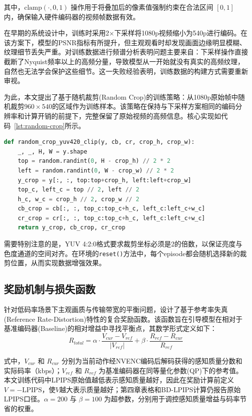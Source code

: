 其中，$\text{clamp}(\cdot, 0, 1)$ 操作用于将叠加后的像素值强制约束在合法区间 $[0, 1]$ 内，确保输入硬件编码器的视频帧数据有效。

在早期的系统设计中，训练时采用2$\times$下采样将1080p视频缩小为540p进行编码。在该方案下，模型的PSNR指标有所提升，但主观观看时却发现画面边缘明显模糊、纹理细节丢失严重。对训练数据进行频谱分析表明问题主要来自：下采样操作直接截断了Nyquist频率以上的高频分量，导致模型从一开始就没有真实的高频纹理，自然也无法学会保护这些细节。这一失败经验表明，训练数据的构建方式需要重新审视。

为此，本文提出了基于随机裁剪(Random Crop)的训练策略：从1080p原始帧中随机裁剪$960 \times 540$的区域作为训练样本。该策略在保持与下采样方案相同的编码分辨率和计算开销的前提下，完整保留了原始视频的高频信息。核心实现如代码~\ref{lst:random-crop}所示。

\begin{lstlisting}[language=Python, caption={YUV420 Random Crop}, label={lst:random-crop}, basicstyle=\ttfamily\footnotesize, aboveskip=2pt, belowskip=2pt]
def random_crop_yuv420_clip(y, cb, cr, crop_h, crop_w):
    _, _, H, W = y.shape
    top = random.randint(0, H - crop_h) // 2 * 2
    left = random.randint(0, W - crop_w) // 2 * 2
    y_crop = y[:, :, top:top+crop_h, left:left+crop_w]
    top_c, left_c = top // 2, left // 2
    h_c, w_c = crop_h // 2, crop_w // 2
    cb_crop = cb[:, :, top_c:top_c+h_c, left_c:left_c+w_c]
    cr_crop = cr[:, :, top_c:top_c+h_c, left_c:left_c+w_c]
    return y_crop, cb_crop, cr_crop
\end{lstlisting}

需要特别注意的是，YUV 4:2:0格式要求裁剪坐标必须是2的倍数，以保证亮度与色度通道的空间对齐。在环境的\texttt{reset()}方法中，每个episode都会随机选择新的裁剪位置，从而实现数据增强效果。

\subsection{奖励机制与损失函数}

针对低码率场景下主观画质与传输带宽的平衡问题，设计了基于参考率失真(Reference Rate-Distortion)特性的复合奖励函数。该函数旨在引导模型在相对于基准编码器(Baseline)的相对增益中寻找平衡点，其数学形式定义如下：
\begin{equation}
  R_{total} = \alpha \cdot \frac{V_{cur} - V_{ref}}{|V_{ref}|} + \beta \cdot \frac{R_{ref} - R_{cur}}{R_{ref}}
  \label{eq:reward}
\end{equation}

式中，$V_{cur}$ 和 $R_{cur}$ 分别为当前动作经NVENC编码后解码获得的感知质量分数和实际码率（kbps）；$V_{ref}$ 和 $R_{ref}$ 为基准编码器在同等量化参数(QP)下的参考值。本文训练代码中LPIPS原始值越低表示感知质量越好，因此在奖励计算前定义$V=-\mathrm{LPIPS}$，使$V$越大表示质量越好；第四章表格和BD-LPIPS计算仍报告原始LPIPS口径。$\alpha = 200$ 与 $\beta = 100$ 为超参数，分别用于调控感知质量增益与码率节省的权重。

